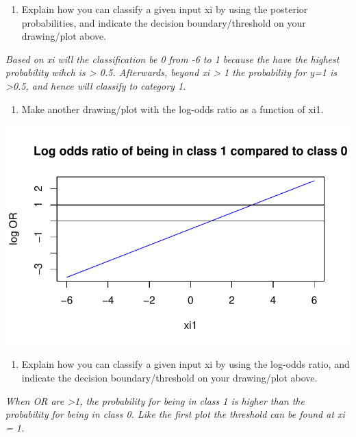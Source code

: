 \documentclass[
  letterpaper,
  DIV=11,
  numbers=noendperiod]{scrartcl}
\providecommand{\tightlist}{%
  \setlength{\itemsep}{0pt}\setlength{\parskip}{0pt}}\usepackage{longtable,booktabs,array}
\begin{document}
\begin{enumerate}
\def\labelenumi{(\alph{enumi})}
\setcounter{enumi}{1}
\tightlist
\item
  Explain how you can classify a given input xi by using the posterior
  probabilities, and indicate the decision boundary/threshold on your
  drawing/plot above.
\end{enumerate}

\emph{Based on xi will the classification be 0 from -6 to 1 because the
have the highest probability wihch is \textgreater{} 0.5. Afterwards,
beyond xi \textgreater{} 1 the probability for y=1 is \textgreater0.5,
and hence will classify to category 1.}

\begin{enumerate}
\def\labelenumi{(\alph{enumi})}
\setcounter{enumi}{2}
\tightlist
\item
  Make another drawing/plot with the log-odds ratio as a function of
  xi1.
\end{enumerate}

\includegraphics{excercise_doc_files/figure-pdf/unnamed-chunk-7-1.pdf}

\begin{enumerate}
\def\labelenumi{(\alph{enumi})}
\setcounter{enumi}{3}
\tightlist
\item
  Explain how you can classify a given input xi by using the log-odds
  ratio, and indicate the decision boundary/threshold on your
  drawing/plot above.
\end{enumerate}

\emph{When OR are \textgreater1, the probability for being in class 1 is
higher than the probability for being in class 0. Like the first plot
the threshold can be found at xi = 1.}
\end{document}
